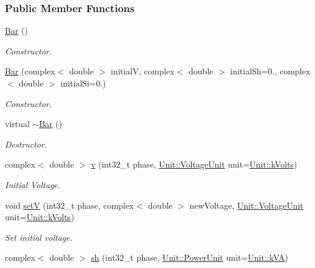 \subsubsection*{Public Member Functions}
\begin{DoxyCompactItemize}
\item 
\hyperlink{group___models_ga9cae2188fcc6cce41caa7898c64548d1}{Bar} ()
\begin{DoxyCompactList}\small\item\em Constructor. \end{DoxyCompactList}\item 
\hyperlink{group___models_gab1c5a81ad40dbc7ee745077b4f5c20d4}{Bar} (complex$<$ double $>$ initial\+V, complex$<$ double $>$ initial\+Sh=0., complex$<$ double $>$ initial\+Si=0.)
\begin{DoxyCompactList}\small\item\em Constructor. \end{DoxyCompactList}\item 
virtual \hyperlink{group___models_ga9c7ebea0c189423591741ac438985316}{$\sim$\+Bar} ()
\begin{DoxyCompactList}\small\item\em Destructor. \end{DoxyCompactList}\item 
complex$<$ double $>$ \hyperlink{group___models_ga1e6f2daec86407118656d88170d1adc2}{v} (int32\+\_\+t phase, \hyperlink{class_unit_a55b07dfa9457e1eca2c7194fe0cfc3c1}{Unit\+::\+Voltage\+Unit} unit=\hyperlink{class_unit_a55b07dfa9457e1eca2c7194fe0cfc3c1aa54b2473993a702a3923525765bd6e4c}{Unit\+::k\+Volts})
\begin{DoxyCompactList}\small\item\em Initial Voltage. \end{DoxyCompactList}\item 
void \hyperlink{group___models_ga9b6fbc92674bfcdc9d5090795ab335a6}{set\+V} (int32\+\_\+t phase, complex$<$ double $>$ new\+Voltage, \hyperlink{class_unit_a55b07dfa9457e1eca2c7194fe0cfc3c1}{Unit\+::\+Voltage\+Unit} unit=\hyperlink{class_unit_a55b07dfa9457e1eca2c7194fe0cfc3c1aa54b2473993a702a3923525765bd6e4c}{Unit\+::k\+Volts})
\begin{DoxyCompactList}\small\item\em Set initial voltage. \end{DoxyCompactList}\item 
complex$<$ double $>$ \hyperlink{group___models_gac188071bf5f165b0acdaa4c8af82355c}{sh} (int32\+\_\+t phase, \hyperlink{class_unit_ace265ae255370ccacfd5370337572c3b}{Unit\+::\+Power\+Unit} unit=\hyperlink{class_unit_ace265ae255370ccacfd5370337572c3ba72b181a842ae2759488a2fa1410d3696}{Unit\+::k\+V\+A})

\end{DoxyCompactItemize}
